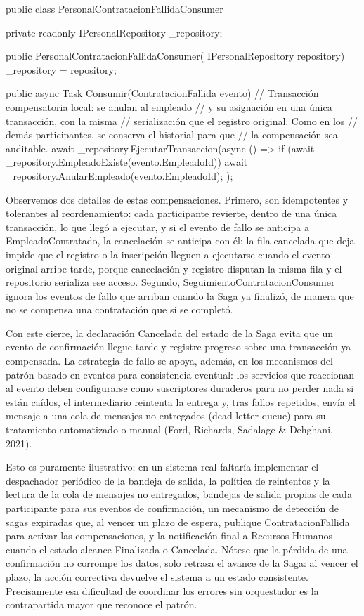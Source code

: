 \documentclass[12pt, a4paper]{article}
\begin{document}
    \begin{csharpbox}
public class PersonalContratacionFallidaConsumer
{
    private readonly IPersonalRepository _repository;

    public PersonalContratacionFallidaConsumer(
        IPersonalRepository repository)
    {
        _repository = repository;
    }

    public async Task Consumir(ContratacionFallida evento)
    {
        // Transacción compensatoria local: se anulan al empleado
        // y su asignación en una única transacción, con la misma
        // serialización que el registro original. Como en los
        // demás participantes, se conserva el historial para que
        // la compensación sea auditable.
        await _repository.EjecutarTransaccion(async () =>
        {
            if (await _repository.EmpleadoExiste(evento.EmpleadoId))
            {
                await _repository.AnularEmpleado(evento.EmpleadoId);
            }
        });
    }
}
    \end{csharpbox}

    Observemos dos detalles de estas compensaciones. Primero, son idempotentes y tolerantes al reordenamiento: cada participante revierte, dentro de una única transacción, lo que llegó a ejecutar, y si el evento de fallo se anticipa a EmpleadoContratado, la cancelación se anticipa con él: la fila cancelada que deja impide que el registro o la inscripción lleguen a ejecutarse cuando el evento original arribe tarde, porque cancelación y registro disputan la misma fila y el repositorio serializa ese acceso. Segundo, SeguimientoContratacionConsumer ignora los eventos de fallo que arriban cuando la Saga ya finalizó, de manera que no se compensa una contratación que sí se completó.

    Con este cierre, la declaración Cancelada del estado de la Saga evita que un evento de confirmación llegue tarde y registre progreso sobre una transacción ya compensada. La estrategia de fallo se apoya, además, en los mecanismos del patrón basado en eventos para consistencia eventual: los servicios que reaccionan al evento deben configurarse como suscriptores duraderos para no perder nada si están caídos, el intermediario reintenta la entrega y, tras fallos repetidos, envía el mensaje a una cola de mensajes no entregados (dead letter queue) para su tratamiento automatizado o manual (Ford, Richards, Sadalage \& Dehghani, 2021).

    Esto es puramente ilustrativo; en un sistema real faltaría implementar el despachador periódico de la bandeja de salida, la política de reintentos y la lectura de la cola de mensajes no entregados, bandejas de salida propias de cada participante para sus eventos de confirmación, un mecanismo de detección de sagas expiradas que, al vencer un plazo de espera, publique ContratacionFallida para activar las compensaciones, y la notificación final a Recursos Humanos cuando el estado alcance Finalizada o Cancelada. Nótese que la pérdida de una confirmación no corrompe los datos, solo retrasa el avance de la Saga: al vencer el plazo, la acción correctiva devuelve el sistema a un estado consistente. Precisamente esa dificultad de coordinar los errores sin orquestador es la contrapartida mayor que reconoce el patrón.
\end{document}
